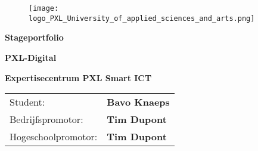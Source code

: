 \begin{titlepage}
  \begin{figure}
    \texttt{[image: logo\_PXL\_University\_of\_applied\_sciences\_and\_arts.png]}
  \end{figure}
  \vspace*{0.5cm}
  \begin{center}
    \Huge\textbf{\textcolor{pxlgreen}{Stageportfolio}}
  \end{center}
  \vspace{0.5cm}
  \begin{center}
    \LARGE\textbf{\textcolor{pxlgreen}{PXL-Digital}}
  \end{center}
  \vspace{2.5cm}
  \begin{center}
    \Large\textbf{Expertisecentrum PXL Smart ICT}
  \end{center}
  \vspace{3cm}
  \begin{tabularx}{\linewidth}{l l}
    Student: & \textbf{Bavo Knaeps}\\
    Bedrijfspromotor: & \textbf{Tim Dupont}\\
    Hogeschoolpromotor: & \textbf{Tim Dupont}
  \end{tabularx}
  \vfill
\end{titlepage}